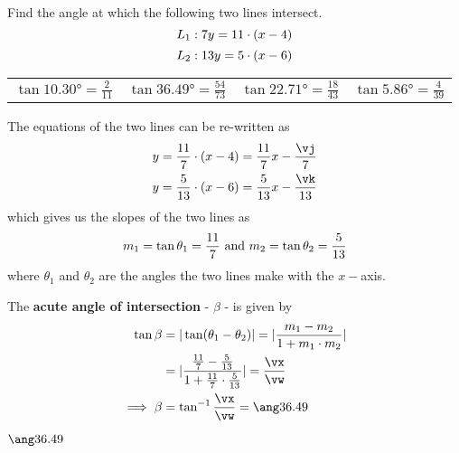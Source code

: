 



\MULTIPLY\ve\va\vj
\MULTIPLY\vf\vc\vk
\FRACMINUS\va\vb\vc\vd\vp\vq
\FRACMULT\va\vb\vc\vd\vr\vs
{}\vr\vs\vt\vu
\FRACDIV\vp\vq\vt\vu\vv\vw
\ABSVALUE\vv\vx

\question[3] Find the angle at which the following two lines intersect.  
  \[ L_1: 7 y = 11\cdot(x-4) \]
  \[ L_2: 13 y = 5\cdot(x-6) \]

\watchout

\begin{calcaid}
  \begin{tabular}{l l  l l}
    $\tan\ang{10.30}=\frac{2}{11}$ & $\tan\ang{36.49}=\frac{54}{73}$ & 
    $\tan\ang{22.71}=\frac{18}{43}$ & $\tan\ang{5.86}=\frac{4}{39}$ 
  \end{tabular} 
\end{calcaid}

\begin{solution}[\halfpage]
	The equations of the two lines can be re-written as 
  \begin{align}
    y &= \frac\va\vb\cdot(x-\ve) = \frac\va\vb x - \frac\vj\vb \\
    y &= \frac\vc\vd\cdot(x-\vf) = \frac\vc\vd x - \frac\vk\vd
  \end{align}
  which gives us the slopes of the two lines as 
  \[ m_1 = \tan\theta_1 = \frac{11}{7}\text{ and } m_2 = \tan\theta_2 = \frac{5}{13} \]
  where $\theta_1$ and $\theta_2$ are the angles the two lines make with the $x-$axis.

  The \textbf{acute angle of intersection} - $\beta$ - is given by 
  \begin{align}
    \tan\beta &= \vert \tan (\theta_1 - \theta_2 ) \vert = \vert \dfrac{m_1 - m_2}{1+m_1\cdot m_2} \vert \\
              &= \vert \dfrac{\frac\va\vb - \frac\vc\vd}{1+\frac\va\vb\cdot\frac\vc\vd} \vert = \frac\vx\vw \\
              \implies\beta &=\tan^{-1}\frac\vx\vw = \ang\vz
  \end{align}
\end{solution}

\ifprintanswers
  \begin{codex}
    $\ang\vz$
  \end{codex}
\fi

